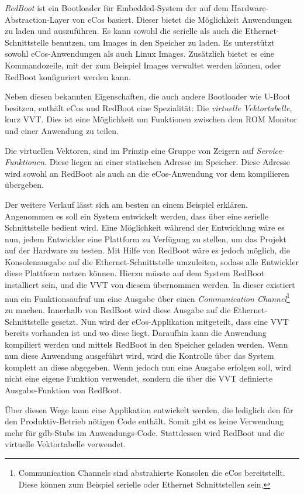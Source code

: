\documentclass[
  a4paper,					%
  twoside,
  DIV=calc,     				%
  bibliography=totoc,
  cleardoublepage=empty,
  ngerman,     					%
  final       					%
]{scrbook}
\begin{document}
\emph{RedBoot} ist ein Bootloader für Embedded-System der auf dem Hardware-Abstraction-Layer von eCos basiert. Dieser bietet die Möglichkeit Anwendungen zu laden und auszuführen. Es kann sowohl die serielle als auch die Ethernet-Schnittstelle benutzen, um Images in den Speicher zu laden. Es unterstützt sowohl eCos-Anwendungen als auch Linux Images. Zusätzlich bietet es eine Kommandozeile, mit der zum Beispiel Images verwaltet werden können, oder RedBoot konfiguriert werden kann.

Neben diesen bekannten Eigenschaften, die auch andere Bootloader wie U-Boot besitzen, enthält eCos und RedBoot eine Spezialität: Die \emph{virtuelle Vektortabelle}, kurz VVT. Dies ist eine Möglichkeit um Funktionen zwischen dem ROM Monitor und einer Anwendung zu teilen.

Die virtuellen Vektoren, sind im Prinzip eine Gruppe von Zeigern auf \emph{Service-Funktionen}. Diese liegen an einer statischen Adresse im Speicher. Diese Adresse wird sowohl an RedBoot als auch an die eCos-Anwendung vor dem kompilieren übergeben.

Der weitere Verlauf lässt sich am besten an einem Beispiel erklären. Angenommen es soll ein System entwickelt werden, dass über eine serielle Schnittstelle bedient wird. Eine Möglichkeit während der Entwicklung wäre es nun, jedem Entwickler eine Plattform zu Verfügung zu stellen, um das Projekt auf der Hardware zu testen. Mit Hilfe von RedBoot wäre es jedoch möglich, die Konsolenausgabe auf die Ethernet-Schnittstelle umzuleiten, sodass alle Entwickler diese Plattform nutzen können. Hierzu müsste auf dem System RedBoot installiert sein, und die VVT von diesem übernommen werden. In dieser existiert nun ein Funktionsaufruf um eine Ausgabe über einen \emph{Communication Channel}\footnote{Communication Channels sind abstrahierte Konsolen die eCos bereitstellt. Diese können zum Beispiel serielle oder Ethernet Schnittstellen sein.} zu machen. Innerhalb von RedBoot wird diese Ausgabe auf die Ethernet-Schnittstelle gesetzt. Nun wird der eCos-Applikation mitgeteilt, dass eine VVT bereits vorhanden ist und wo diese liegt. Daraufhin kann die Anwendung kompiliert werden und mittels RedBoot in den Speicher geladen werden. Wenn nun diese Anwendung ausgeführt wird, wird die Kontrolle über das System komplett an diese abgegeben. Wenn jedoch nun eine Ausgabe erfolgen soll, wird nicht eine eigene Funktion verwendet, sondern die über die VVT definierte Ausgabe-Funktion von RedBoot.

Über diesen Wege kann eine Applikation entwickelt werden, die lediglich den für den Produktiv-Betrieb nötigen Code enthält. Somit gibt es keine Verwendung mehr für gdb-Stubs im Anwendungs-Code. Stattdessen wird RedBoot und die virtuelle Vektortabelle verwendet.
\end{document}
